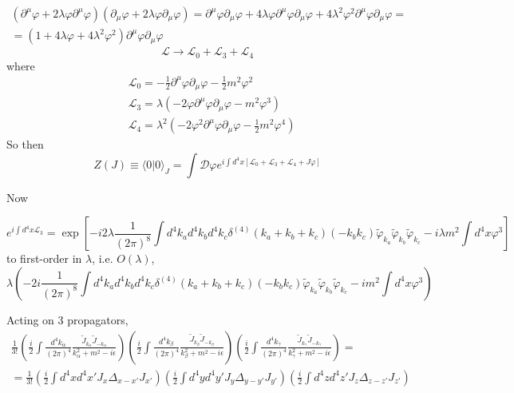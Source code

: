 \documentclass[twoside]{amsart}
\begin{document}
\[
\begin{gathered}
  (\partial^{\mu} \varphi + 2 \lambda \varphi \partial^{\mu} \varphi) ( \partial_{\mu} \varphi + 2 \lambda \varphi \partial_{\mu} \varphi )  = \partial^{\mu} \varphi \partial_{\mu} \varphi + 4 \lambda \varphi \partial^{\mu} \varphi \partial_{\mu} \varphi + 4 \lambda^2 \varphi^2 \partial^{\mu} \varphi \partial_{\mu} \varphi = \\ 
  = ( 1 + 4 \lambda \varphi + 4 \lambda^2 \varphi^2 ) \partial^{\mu} \varphi \partial_{\mu} \varphi
\end{gathered}
\]
\[
\mathcal{L} \to \mathcal{L}_0 + \mathcal{L}_3 + \mathcal{L}_4
\]
where
\[
\begin{aligned}
  & \mathcal{L}_0 = - \frac{1}{2} \partial^{\mu} \varphi \partial_{\mu} \varphi - \frac{1}{2} m^2  \varphi^2 \\
  & \mathcal{L}_3 = \lambda \left( -2 \varphi \partial^{\mu} \varphi \partial_{\mu} \varphi - m^2 \varphi^3 \right) \\ 
  & \mathcal{L}_4 = \lambda^2 \left( -2 \varphi^2 \partial^{\mu} \varphi \partial_{\mu} \varphi - \frac{1}{2} m^2 \varphi^4 \right)
\end{aligned}
\]
So then
\[
Z(J) \equiv \langle 0 | 0 \rangle_J = \int \mathcal{D} \varphi e^{ i \int d^4x \left[ \mathcal{L}_0 + \mathcal{L}_3 + \mathcal{L}_4 + J \varphi \right] }
\]

Now

\[
e^{ i \int d^4x \mathcal{L}_3 } = \exp{ \left[ - i 2 \lambda \frac{ 1 }{ (2\pi)^8 } \int d^4k_a d^4k_b d^4k_c \delta^{(4)}(k_a + k_b +k_c)( -k_b k_c) \widetilde{\varphi}_{k_a} \widetilde{\varphi}_{k_b} \widetilde{\varphi}_{k_c} - i \lambda m^2 \int d^4x \varphi^3 \right] }
\]
to first-order in $\lambda$, i.e. $O(\lambda)$, 
\[
\lambda \left( - 2 i \frac{1}{ ( 2\pi)^8 } \int d^4k_a d^4k_b d^4k_c \delta^{(4)}(k_a + k_b + k_c) (- k_b k_c) \widetilde{\varphi}_{k_a} \widetilde{\varphi}_{k_b} \widetilde{\varphi}_{k_c} - i m^2 \int d^4x \varphi^3 \right)
\]

Acting on 3 propagators,
\[
\begin{gathered}
  \frac{1}{3!} \left( \frac{ i }{2} \int \frac{ d^4k_{ \alpha} }{ (2\pi)^4 } \frac{ \widetilde{ J}_{k_{\alpha} } \widetilde{ J}_{-k_{\alpha}} }{ k_{\alpha}^2 + m^2 - i \epsilon } \right) \left( \frac{ i }{2} \int \frac{ d^4k_{ \beta} }{ (2\pi)^4 } \frac{ \widetilde{ J}_{k_{\beta} } \widetilde{ J}_{-k_{\beta}} }{ k_{\beta}^2 + m^2 - i \epsilon } \right) \left( \frac{ i }{2} \int \frac{ d^4k_{ \gamma} }{ (2\pi)^4 } \frac{ \widetilde{ J}_{k_{\gamma} } \widetilde{ J}_{-k_{\gamma}} }{ k_{\gamma}^2 + m^2 - i \epsilon } \right) = \\ 
  = \frac{1}{3!} \left( \frac{i }{2} \int d^4x d^4x' J_x \Delta_{x-x'} J_{x'} \right) \left( \frac{i }{2} \int d^4y d^4y' J_y \Delta_{y-y'} J_{y'} \right) \left( \frac{i }{2} \int d^4z d^4z' J_z \Delta_{z-z'} J_{z'} \right)
\end{gathered}
\]
\end{document}
